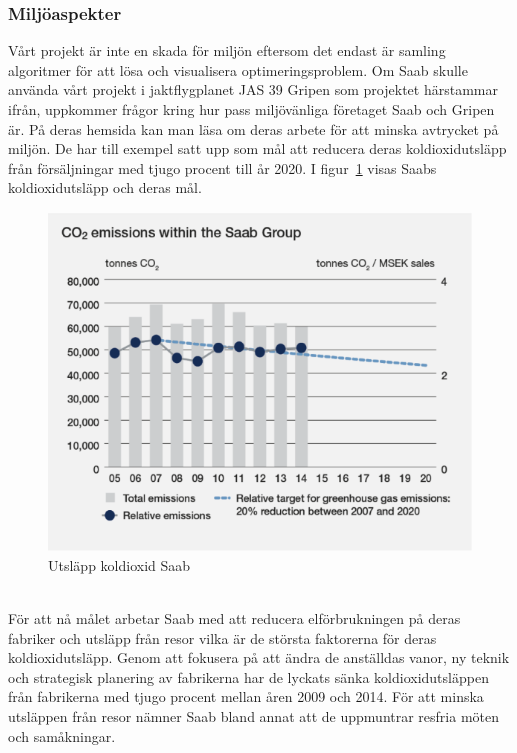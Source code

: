 \subsubsection{Miljöaspekter}
Vårt projekt är inte en skada för miljön eftersom det endast är samling algoritmer för att lösa och visualisera optimeringsproblem.  
\newline
\newline
Om Saab skulle använda vårt projekt i jaktflygplanet JAS 39 Gripen som projektet härstammar ifrån, uppkommer frågor kring hur pass miljövänliga företaget Saab och Gripen är. På deras hemsida \citep{saabimpact} kan man läsa om deras arbete för att minska avtrycket på miljön. De har till exempel satt upp som mål att reducera deras koldioxidutsläpp från försäljningar med tjugo procent till år 2020. I figur~\ref{fig:saabkoldioxid} visas Saabs koldioxidutsläpp och deras mål.   
\leavevmode
\begin{figure}[h]
	\centering
	\includegraphics[scale=1.5]{grafik/saabemissions.png}
	\caption{Utsläpp koldioxid Saab \citep{saabimg2}}\label{fig:saabkoldioxid}	
\end{figure} 
\\
För att nå målet arbetar Saab med att reducera elförbrukningen på deras fabriker och utsläpp från resor vilka är de största faktorerna för deras koldioxidutsläpp. Genom att fokusera på att ändra de anställdas vanor, ny teknik och strategisk planering av fabrikerna har de lyckats sänka koldioxidutsläppen från fabrikerna med tjugo procent mellan åren 2009 och 2014. För att minska utsläppen från resor nämner Saab bland annat att de uppmuntrar resfria möten och samåkningar.
